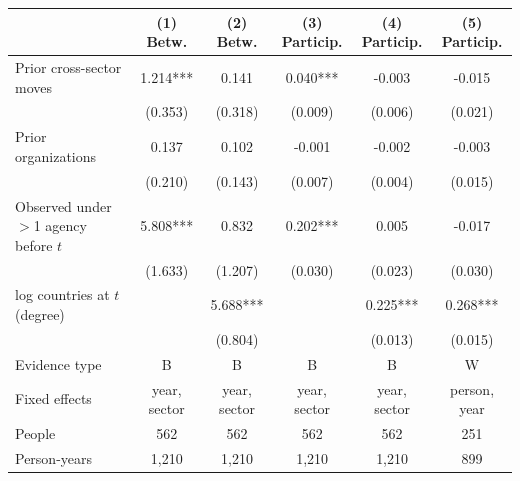 \begin{tabular}{lccccc}
\toprule
 & (1) Betw. & (2) Betw. & (3) Particip. & (4) Particip. & (5) Particip. \\
\midrule
Prior cross-sector moves & 1.214*** & 0.141 & 0.040*** & -0.003 & -0.015 \\
 & (0.353) & (0.318) & (0.009) & (0.006) & (0.021) \\
Prior organizations & 0.137 & 0.102 & -0.001 & -0.002 & -0.003 \\
 & (0.210) & (0.143) & (0.007) & (0.004) & (0.015) \\
Observed under $>$1 agency before $t$ & 5.808*** & 0.832 & 0.202*** & 0.005 & -0.017 \\
 & (1.633) & (1.207) & (0.030) & (0.023) & (0.030) \\
log countries at $t$ (degree) &  & 5.688*** &  & 0.225*** & 0.268*** \\
 &  & (0.804) &  & (0.013) & (0.015) \\
Evidence type & B & B & B & B & W \\
Fixed effects & year, sector & year, sector & year, sector & year, sector & person, year \\
People & 562 & 562 & 562 & 562 & 251 \\
Person-years & 1,210 & 1,210 & 1,210 & 1,210 & 899 \\
\bottomrule
\end{tabular}
